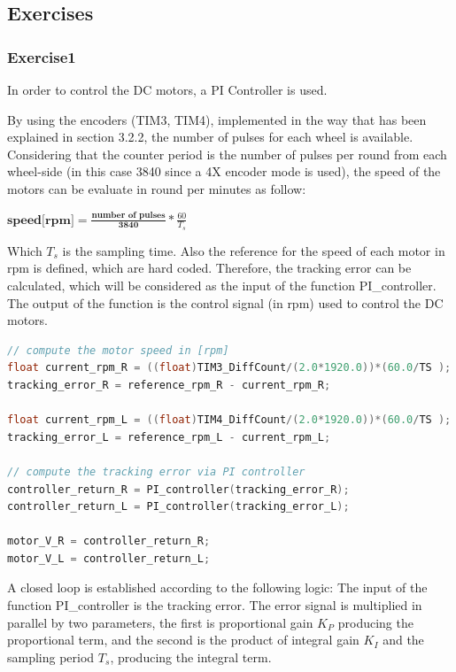 \documentclass[english]{article}
\begin{document}
\subsection{Exercises}
\subsubsection{Exercise1}
In order to control the DC motors, a PI Controller is used. 

By using the encoders (TIM3, TIM4), implemented in the way that has been explained 
in section 3.2.2, the number of pulses for each wheel is available. Considering 
that the counter period is the number of pulses per round from each wheel-side
 (in this case 3840 since a 4X encoder mode is used),  the 
 speed of the motors can be evaluate in round per minutes as follow: \newline
 \begin{center}
    $\textbf{speed[rpm]} = \frac{\textbf{number of pulses}}{\textbf{3840}} * \frac{60}{T_s}$
 \end{center}
 Which $T_s$ is the sampling time. Also the reference for the 
 speed of each motor in rpm is defined, which are hard coded. Therefore,  the tracking error can be 
 calculated, which will be considered as the input of
  the function PI\_controller. The output of the function is the control signal
   (in rpm) used to control the DC motors. 
\begin{lstlisting}[language=C, caption={calculating the control signal for DC motors in rpm }, label={lst:rpm} ]
// compute the motor speed in [rpm]
float current_rpm_R = ((float)TIM3_DiffCount/(2.0*1920.0))*(60.0/TS );
tracking_error_R = reference_rpm_R - current_rpm_R;

float current_rpm_L = ((float)TIM4_DiffCount/(2.0*1920.0))*(60.0/TS );
tracking_error_L = reference_rpm_L - current_rpm_L;

// compute the tracking error via PI controller
controller_return_R = PI_controller(tracking_error_R);
controller_return_L = PI_controller(tracking_error_L);

motor_V_R = controller_return_R;
motor_V_L = controller_return_L; 
\end{lstlisting}
A closed loop is established according to the following logic: 
The input of the function PI\_controller is the tracking error.
 The error signal is multiplied in parallel by two parameters, the 
 first is proportional gain $K_P$ producing the proportional term, and
  the second is the product of integral gain $K_I$ and the sampling period 
   $T_s$, producing the integral term.  
\end{document}
